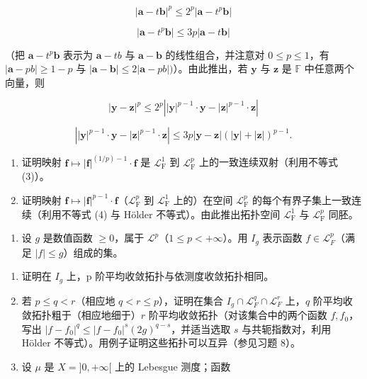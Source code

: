 \[
| \mathbf {a} - t \mathbf {b} | ^ {p} \leqslant 2 ^ {p} | \mathbf {a} - t ^ {p} \mathbf {b} |\tag{1}
\]

\[
| \mathbf {a} - t ^ {p} \mathbf {b} | \leqslant 3 p | \mathbf {a} - t \mathbf {b} |\tag{2}
\]

（把 \(\mathbf{a} - t^{p}\mathbf{b}\) 表示为 \(\mathbf{a} - tb\) 与 \(\mathbf{a} - \mathbf{b}\) 的线性组合，并注意对 \(0\leqslant p\leqslant 1\)，有 \(|\mathbf{a} - pb|\geqslant 1 - p\) 与 \(|\mathbf{a} - \mathbf{b}|\leqslant 2|\mathbf{a} - pb|)\)）。由此推出，若 \(\mathbf{y}\) 与 \(\mathbf{z}\) 是 \(\mathbb{F}\) 中任意两个向量，则

\[
\left| \mathbf {y} - \mathbf {z} \right| ^ {p} \leqslant 2 ^ {p} \left| \left| \mathbf {y} \right| ^ {p - 1} \cdot \mathbf {y} - \left| \mathbf {z} \right| ^ {p - 1} \cdot \mathbf {z} \right|\tag{3}
\]

\[
\left| | \mathbf {y} | ^ {p - 1} \cdot \mathbf {y} - | \mathbf {z} | ^ {p - 1} \cdot \mathbf {z} \right| \leqslant 3 p | \mathbf {y} - \mathbf {z} | (| \mathbf {y} | + | \mathbf {z} |) ^ {p - 1}.\tag{4}
\]

\begin{enumerate}
\def\labelenumi{\alph{enumi})}
\setcounter{enumi}{1}
\item
  证明映射 \(\mathbf{f} \mapsto |\mathbf{f}|^{(1/p)-1} \cdot \mathbf{f}\) 是 \(\mathcal{L}_{\mathrm{F}}^{1}\) 到 \(\mathcal{L}_{\mathrm{F}}^{p}\) 上的一致连续双射（利用不等式 (3)）。
\item
  证明映射 \(\mathbf{f} \mapsto |\mathbf{f}|^{p-1} \cdot \mathbf{f}\)（\(\mathcal{L}_{\mathrm{F}}^{p}\) 到 \(\mathcal{L}_{\mathrm{F}}^{1}\) 上的）在空间 \(\mathcal{L}_{\mathrm{F}}^{p}\) 的每个有界子集上一致连续（利用不等式 (4) 与 Hölder 不等式）。由此推出拓扑空间 \(\mathcal{L}_{\mathrm{F}}^{1}\) 与 \(\mathcal{L}_{\mathrm{F}}^{p}\) 同胚。
\end{enumerate}

\begin{enumerate}
\def\labelenumi{\arabic{enumi})}
\setcounter{enumi}{10}
\tightlist
\item
  设 \(g\) 是数值函数 \(\geqslant 0\)，属于 \(\mathcal{L}^p\)（\(1 \leqslant p < +\infty\)）。用 \(I_g\) 表示函数 \(f \in \mathcal{L}_F^p\)（满足 \(|f| \leqslant g\)）组成的集。
\end{enumerate}

\begin{enumerate}
\def\labelenumi{\alph{enumi})}
\item
  证明在 \(I_{g}\) 上，p 阶平均收敛拓扑与依测度收敛拓扑相同。
\item
  若 \(p \leqslant q < r\)（相应地 \(q < r \leqslant p\)），证明在集合 \(I_g \cap \mathcal{L}_F^q \cap \mathcal{L}_F^r\) 上，\(q\) 阶平均收敛拓扑粗于（相应地细于）\(r\) 阶平均收敛拓扑（对该集合中的两个函数 \(f, f_0\)，写出 \(|f - f_0|^q \leqslant |f - f_0|^s(2g)^{q-s}\)，并适当选取 \(s\) 与共轭指数对，利用 Hölder 不等式）。用例子证明这些拓扑可以互异（参见习题 8）。
\item
  设 \(\mu\) 是 \(X = ]0, +\infty[\) 上的 Lebesgue 测度；函数
\end{enumerate}


